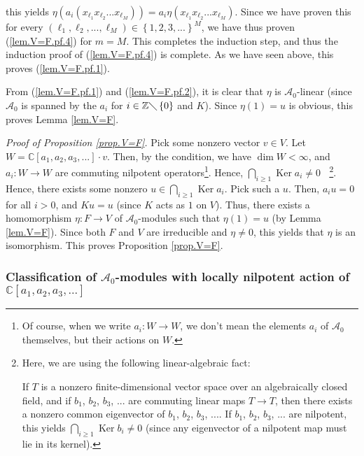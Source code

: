 \documentclass[etingof-lie.tex]{subfiles}
\begin{document}
this yields $\eta\left(  a_{i}\left(  x_{\ell_{1}}x_{\ell_{2}}...x_{\ell_{M}%
}\right)  \right)  =a_{i}\eta\left(  x_{\ell_{1}}x_{\ell_{2}}...x_{\ell_{M}%
}\right)  $. Since we have proven this for every $\left(  \ell_{1},\ell
_{2},...,\ell_{M}\right)  \in\left\{  1,2,3,...\right\}  ^{M}$, we have thus
proven (\ref{lem.V=F.pf.4}) for $m=M$. This completes the induction step, and
thus the induction proof of (\ref{lem.V=F.pf.4}) is complete. As we have seen
above, this proves (\ref{lem.V=F.pf.1}).

From (\ref{lem.V=F.pf.1}) and (\ref{lem.V=F.pf.2}), it is clear that $\eta$ is
$\mathcal{A}_{0}$-linear (since $\mathcal{A}_{0}$ is spanned by the $a_{i}$
for $i\in\mathbb{Z}\diagdown\left\{  0\right\}  $ and $K$). Since $\eta\left(
1\right)  =u$ is obvious, this proves Lemma \ref{lem.V=F}.

\textit{Proof of Proposition \ref{prop.V=F}.} Pick some nonzero vector $v\in
V$. Let $W=\mathbb{C}\left[  a_{1},a_{2},a_{3},...\right]  \cdot v$. Then, by
the condition, we have $\dim W<\infty$, and $a_{i}:W\rightarrow W$ are
commuting nilpotent operators\footnote{Of course, when we write $a_{i}%
:W\rightarrow W$, we don't mean the elements $a_{i}$ of $\mathcal{A}_{0}$
themselves, but their actions on $W$.}. Hence, $\bigcap\limits_{i\geq
1}\operatorname*{Ker}a_{i}\neq0\ \ \ \ $\footnote{Here, we are using the
following linear-algebraic fact:
\par
If $T$ is a nonzero finite-dimensional vector space over an algebraically
closed field, and if $b_{1}$, $b_{2}$, $b_{3}$, $...$ are commuting linear
maps $T\rightarrow T$, then there exists a nonzero common eigenvector of
$b_{1}$, $b_{2}$, $b_{3}$, $...$. If $b_{1}$, $b_{2}$, $b_{3}$, $...$ are
nilpotent, this yields $\bigcap\limits_{i\geq1}\operatorname*{Ker}b_{i}\neq0$
(since any eigenvector of a nilpotent map must lie in its kernel).}. Hence,
there exists some nonzero $u\in\bigcap\limits_{i\geq1}\operatorname*{Ker}%
a_{i}$. Pick such a $u$. Then, $a_{i}u=0$ for all $i>0$, and $Ku=u$ (since $K$
acts as $1$ on $V$). Thus, there exists a homomorphism $\eta:F\rightarrow V$
of $\mathcal{A}_{0}$-modules such that $\eta\left(  1\right)  =u$ (by Lemma
\ref{lem.V=F}). Since both $F$ and $V$ are irreducible and $\eta\neq0$, this
yields that $\eta$ is an isomorphism. This proves Proposition \ref{prop.V=F}.

\subsubsection{Classification of
\texorpdfstring{$\mathcal{A}_{0}$}{A0}-modules with locally nilpotent action
of
\texorpdfstring{$\mathbb{C}\left[  a_{1},a_{2},a_{3},...\right]  $}{C[a1,a2,a3,...]}}%
\end{document}
